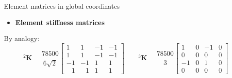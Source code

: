\documentclass[aspectratio=169]{beamer}
\begin{document}
\begin{frame}{Element matrices in global coordinates}
  \vspace{-0.7cm}
  \begin{itemize}
    \item     \small\textbf{Element stiffness matrices}
  \end{itemize}
  \vspace{0.1cm}
  {\centering
  }
  By analogy:
  $${}^2\mathbf{K} =
    \frac{78500}{6\sqrt{2}}
    \begin{bmatrix}
      1  & 1  & -1 & -1 \\
      1  & 1  & -1 & -1 \\
      -1 & -1 & 1  & 1  \\
      -1 & -1 & 1  & 1
    \end{bmatrix}\qquad {}^3\mathbf{K} =
    \frac{78500}{3}
    \begin{bmatrix}
      1  & 0 & -1 & 0 \\
      0  & 0 & 0  & 0 \\
      -1 & 0 & 1  & 0 \\
      0  & 0 & 0  & 0
    \end{bmatrix}
$$
\end{frame}
\end{document}

